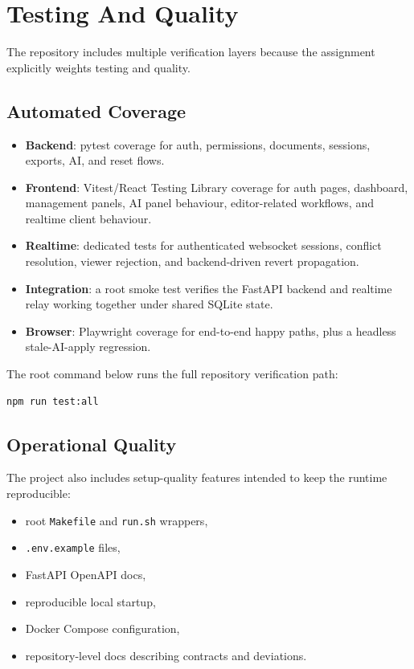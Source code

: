 \chapter{Testing And Quality}

The repository includes multiple verification layers because the assignment explicitly weights testing and
quality.

\section{Automated Coverage}

\begin{itemize}
  \item \textbf{Backend}: pytest coverage for auth, permissions, documents, sessions, exports, AI, and
  reset flows.
  \item \textbf{Frontend}: Vitest/React Testing Library coverage for auth pages, dashboard, management
  panels, AI panel behaviour, editor-related workflows, and realtime client behaviour.
  \item \textbf{Realtime}: dedicated tests for authenticated websocket sessions, conflict resolution,
  viewer rejection, and backend-driven revert propagation.
  \item \textbf{Integration}: a root smoke test verifies the FastAPI backend and realtime relay working
  together under shared SQLite state.
  \item \textbf{Browser}: Playwright coverage for end-to-end happy paths, plus a headless stale-AI-apply
  regression.
\end{itemize}

The root command below runs the full repository verification path:

\begin{lstlisting}[language={}]
npm run test:all
\end{lstlisting}

\section{Operational Quality}

The project also includes setup-quality features intended to keep the runtime reproducible:

\begin{itemize}
  \item root \texttt{Makefile} and \texttt{run.sh} wrappers,
  \item \texttt{.env.example} files,
  \item FastAPI OpenAPI docs,
  \item reproducible local startup,
  \item Docker Compose configuration,
  \item repository-level docs describing contracts and deviations.
\end{itemize}
